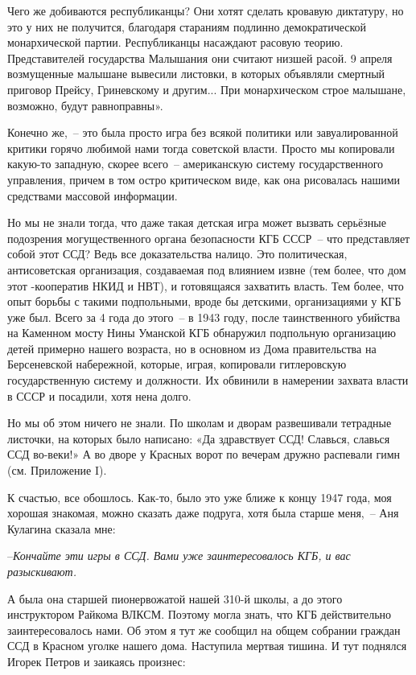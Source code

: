 Чего же добиваются республиканцы? Они хотят сделать кровавую диктатуру, но это у них не получится, благодаря стараниям подлинно демократической монархической партии. Республиканцы насаждают расовую теорию. Представителей государства Малышания они считают низшей расой. 9 апреля возмущенные малышане вывесили листовки, в которых объявляли смертный приговор Прейсу, Гриневскому и другим... При монархическом строе малышане, возможно, будут равноправны».

Конечно же,~-- это была просто игра без всякой политики или завуалированной критики горячо любимой нами тогда советской власти. Просто мы копировали какую-то западную, скорее всего~-- американскую систему государственного управления, причем в том остро критическом виде, как она рисовалась нашими средствами массовой информации.

Но мы не знали тогда, что даже такая детская игра может вызвать серьёзные подозрения могущественного органа безопасности КГБ СССР~-- что представляет собой этот ССД? Ведь все доказательства налицо. Это политическая, антисоветская организация, создаваемая под влиянием извне (тем более, что дом этот -кооператив НКИД и НВТ), и готовящаяся захватить власть. Тем более, что опыт борьбы с такими подпольными, вроде бы детскими, организациями у КГБ уже был. Всего за 4 года до этого~-- в 1943 году, после таинственного убийства на Каменном мосту Нины Уманской КГБ обнаружил подпольную организацию детей примерно нашего возраста, но в основном из Дома правительства на Берсеневской набережной, которые, играя, копировали гитлеровскую государственную систему и должности. Их обвинили в намерении захвата власти в СССР и посадили, хотя нена долго.

Но мы об этом ничего не знали. По школам и дворам развешивали тетрадные листочки, на которых было написано: «Да здравствует ССД! Славься, славься ССД во-веки!» А во дворе у Красных ворот по вечерам дружно распевали гимн (см. Приложение I).

К счастью, все обошлось. Как-то, было это уже ближе к концу 1947 года, моя хорошая знакомая, можно сказать даже подруга, хотя была старше меня,~-- Аня Кулагина сказала мне:

--\textit{Кончайте эти игры в ССД. Вами уже заинтересовалось КГБ, и вас разыскивают.}

А была она старшей пионервожатой нашей 310-й школы, а до этого инструктором Райкома ВЛКСМ. Поэтому могла знать, что КГБ действительно заинтересовалось нами. Об этом я тут же сообщил на общем собрании граждан ССД в Красном уголке нашего дома. Наступила мертвая тишина. И тут поднялся Игорек Петров и заикаясь произнес:

